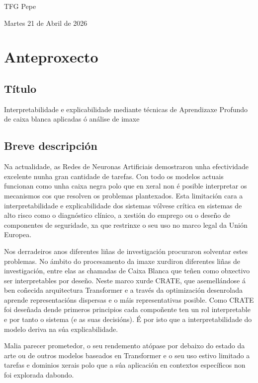 \documentclass[a4paper,12pt]{article}
\begin{document}
{\centering \textsf{TFG Pepe}\par}

\vspace{0.5in}

{\huge Martes 21 de Abril de 2026}



\section{Anteproxecto}
\subsection{Título}
Interpretabilidade e explicabilidade mediante técnicas de Aprendizaxe Profundo de caixa blanca aplicadas ó análise de imaxe
\subsection{Breve descripción}
Na actualidade, as Redes de Neuronas Artificiais demostraron unha efectividade excelente nunha gran cantidade de tarefas. Con todo os modelos actuais funcionan como unha caixa negra polo que en xeral non é posible interpretar os mecanismos cos que resolven os problemas plantexados. Esta limitación cara a  interpretabilidade e explicabilidade dos sistemas vólvese crítica en sistemas de alto risco como o diagnóstico clínico, a xestión do emprego ou o deseño de componentes de seguridade, xa que restrinxe o seu uso no marco legal da Unión Europea.

Nos derradeiros anos diferentes liñas de investigación procuraron solventar estes problemas. No ámbito do procesamento da imaxe xurdiron diferentes liñas de investigación, entre elas as chamadas de Caixa Blanca que teñen como obxectivo ser interpretables por deseño. Neste marco xurde CRATE, que asemellándose á ben coñecida arquitectura Transformer e a través da optimización desenrolada aprende representacións dispersas e o máis representativas posible. Como CRATE foi deseñada dende primeros principios cada compoñente ten un rol interpretable e por tanto o sistema (e as suas decisións). É por isto que a interpretabilidade do modelo deriva na súa explicabilidade.

Malia parecer prometedor, o seu rendemento atópase por debaixo do estado da arte ou de outros modelos baseados en Transformer e o seu uso estivo limitado a tarefas e dominios xerais polo que a súa aplicación en contextos específicos non foi explorada dabondo.
\end{document}
